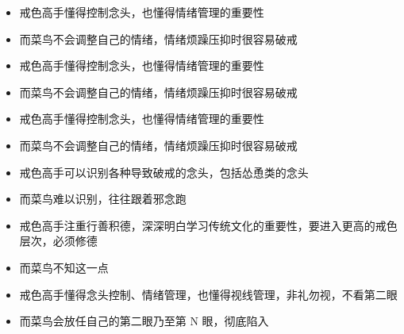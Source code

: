 \begin{paracol}{2}
    \begin{itemize}
        \item 戒色高手懂得控制念头，也懂得情绪管理的重要性
    \end{itemize}
    \switchcolumn
    \begin{itemize}
        \item 而菜鸟不会调整自己的情绪，情绪烦躁压抑时很容易破戒
    \end{itemize}
    \switchcolumn*

    \begin{itemize}
        \item 戒色高手懂得控制念头，也懂得情绪管理的重要性
    \end{itemize}
    \switchcolumn
    \begin{itemize}
        \item 而菜鸟不会调整自己的情绪，情绪烦躁压抑时很容易破戒
    \end{itemize}
    \switchcolumn*

    \begin{itemize}
        \item 戒色高手懂得控制念头，也懂得情绪管理的重要性
    \end{itemize}
    \switchcolumn
    \begin{itemize}
        \item 而菜鸟不会调整自己的情绪，情绪烦躁压抑时很容易破戒
    \end{itemize}
    \switchcolumn*

    \begin{itemize}
        \item 戒色高手可以识别各种导致破戒的念头，包括怂恿类的念头
    \end{itemize}
    \switchcolumn
    \begin{itemize}
        \item 而菜鸟难以识别，往往跟着邪念跑
    \end{itemize}
    \switchcolumn*

    \begin{itemize}
        \item 戒色高手注重行善积德，深深明白学习传统文化的重要性，要进入更高的戒色层次，必须修德
    \end{itemize}
    \switchcolumn
    \begin{itemize}
        \item 而菜鸟不知这一点
    \end{itemize}
    \switchcolumn*

    \begin{itemize}
        \item 戒色高手懂得念头控制、情绪管理，也懂得视线管理，非礼勿视，不看第二眼
    \end{itemize}
    \switchcolumn
    \begin{itemize}
        \item 而菜鸟会放任自己的第二眼乃至第 N 眼，彻底陷入
    \end{itemize}
    \switchcolumn*


\end{paracol}
